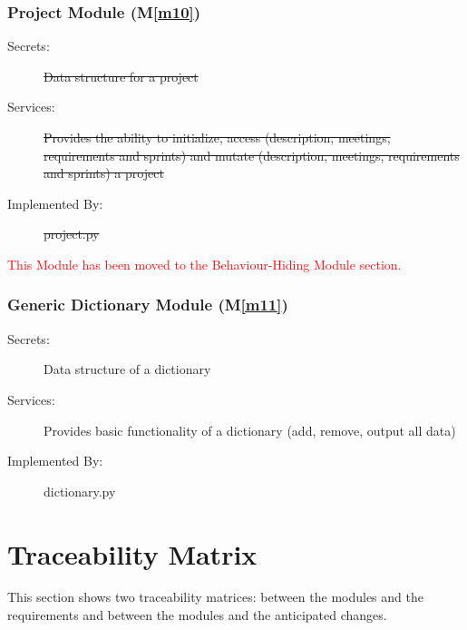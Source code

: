 \documentclass[12pt, titlepage]{article}
\newcommand{\mref}[1]{M\ref{#1}}
\begin{document}
\subsubsection{Project Module (\mref{m10})}
\begin{description}
    \item[Secrets:] \sout{Data structure for a project}
    \item[Services:] \sout{Provides the ability to initialize, access (description, meetings, requirements and sprints) and mutate (description, meetings, requirements and sprints) a project}
    \item[Implemented By:] \sout{project.py}
\end{description}
\textcolor{red}{This Module has been moved to the Behaviour-Hiding Module section.}

\subsubsection{Generic Dictionary Module (\mref{m11})}
\begin{description}
    \item[Secrets:] Data structure of a dictionary
    \item[Services:] Provides basic functionality of a dictionary (add, remove, output all data)
    \item[Implemented By:] dictionary.py
\end{description}

\section{Traceability Matrix} \label{SecTM}

This section shows two traceability matrices: between the modules and the
requirements and between the modules and the anticipated changes.
\end{document}
